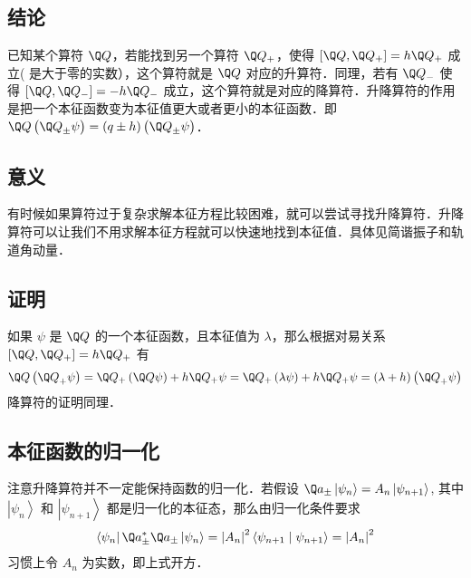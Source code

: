 

\subsection{结论}

已知某个算符 $\Q Q$，若能找到另一个算符 ${\Q Q_ + }$，使得 $[\Q Q,{\Q Q_ + }] = h{\Q Q_ + }$ 成立( 是大于零的实数），这个算符就是 $\Q Q$ 对应的升算符．同理，若有 ${\Q Q_- }$ 使得 $[\Q Q,{\Q Q_ - }] =  - h{\Q Q_ - }$ 成立，这个算符就是对应的降算符．升降算符的作用是把一个本征函数变为本征值更大或者更小的本征函数．即 $\Q Q\left( {{{\Q Q}_ \pm }\psi } \right) = \left( {q \pm h} \right)\left( {{{\Q Q}_ \pm }\psi } \right)$．

\subsection{意义}
有时候如果算符过于复杂求解本征方程比较困难，就可以尝试寻找升降算符．升降算符可以让我们不用求解本征方程就可以快速地找到本征值．具体见简谐振子和轨道角动量．%

\subsection{证明}
如果 $\psi$ 是 $\Q Q$ 的一个本征函数，且本征值为 $\lambda$，那么根据对易关系 $[\Q Q,{\Q Q_ + }] = h{\Q Q_ + }$ 有
\begin{equation}
\Q Q\left( {{{\Q Q}_ + }\psi } \right) = {\Q Q_ + }\left( {\Q Q\psi } \right) + h{\Q Q_ + }\psi  = {\Q Q_ + }\left( {\lambda \psi } \right) + h{\Q Q_ + }\psi  = \left( {\lambda  + h} \right)\left( {{{\Q Q}_ + }\psi } \right)
\end{equation}
降算符的证明同理．

\subsection{本征函数的归一化}
注意升降算符并不一定能保持函数的归一化．若假设 ${\Q a_ \pm }\left| {{\psi_n}} \right\rangle  = {A_n}\left| {{\psi_{n + 1}}} \right\rangle$, 其中 $\left| {{\psi_n}} \right\rangle$ 和 $\left| {{\psi_{n + 1}}} \right\rangle$ 都是归一化的本征态，那么由归一化条件要求
\begin{equation}
\left\langle {{\psi_n}} \right|\Q a_ \pm ^ * {\Q a_ \pm }\left| {{\psi_n}} \right\rangle  = {\left| {{A_n}} \right|^2}\left\langle {{{\psi_{n + 1}}}}
 \mathrel{\left | {\vphantom {{{\psi_{n + 1}}} {{\psi_{n + 1}}}}}
 \right. \kern-\nulldelimiterspace}
 {{{\psi_{n + 1}}}} \right\rangle  = {\left| {{A_n}} \right|^2}
\end{equation}
习惯上令 $A_n$ 为实数，即上式开方． 

